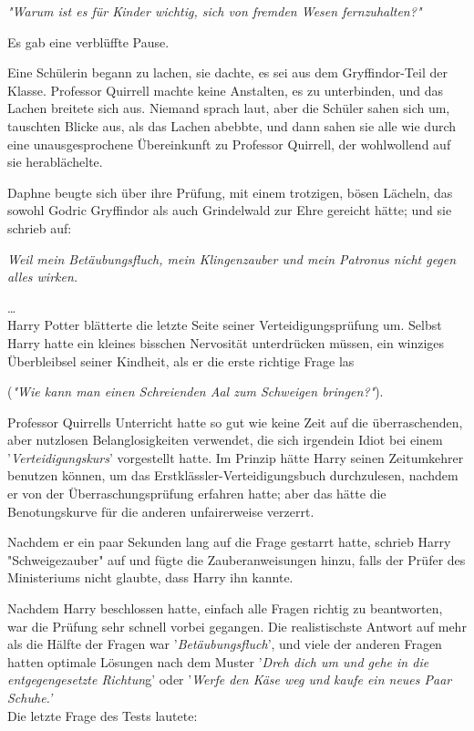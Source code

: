 {\emph{"Warum ist es für Kinder wichtig, sich von fremden Wesen fernzuhalten?"}

Es gab eine verblüffte Pause.

Eine Schülerin begann zu lachen, sie dachte, es sei aus dem Gryffindor-Teil der Klasse. Professor Quirrell machte keine Anstalten, es zu unterbinden, und das Lachen breitete sich aus. Niemand sprach laut, aber die Schüler sahen sich um, tauschten Blicke aus, als das Lachen abebbte, und dann sahen sie alle wie durch eine unausgesprochene Übereinkunft zu Professor Quirrell, der wohlwollend auf sie herablächelte.

Daphne beugte sich über ihre Prüfung, mit einem trotzigen, bösen Lächeln, das sowohl Godric Gryffindor als auch Grindelwald zur Ehre gereicht hätte; und sie schrieb auf:

\emph{Weil mein Betäubungsfluch, mein Klingenzauber und mein Patronus nicht gegen alles wirken.}

…\\ Harry Potter blätterte die letzte Seite seiner Verteidigungsprüfung um. Selbst Harry hatte ein kleines bisschen Nervosität unterdrücken müssen, ein winziges Überbleibsel seiner Kindheit, als er die erste richtige Frage las

(\emph{"Wie kann man einen Schreienden Aal zum Schweigen bringen?"}).

Professor Quirrells Unterricht hatte so gut wie keine Zeit auf die überraschenden, aber nutzlosen Belanglosigkeiten verwendet, die sich irgendein Idiot bei einem '\emph{Verteidigungskurs}' vorgestellt hatte. Im Prinzip hätte Harry seinen Zeitumkehrer benutzen können, um das Erstklässler-Verteidigungsbuch durchzulesen, nachdem er von der Überraschungsprüfung erfahren hatte; aber das hätte die Benotungskurve für die anderen unfairerweise verzerrt.

Nachdem er ein paar Sekunden lang auf die Frage gestarrt hatte, schrieb Harry "Schweigezauber" auf und fügte die Zauberanweisungen hinzu, falls der Prüfer des Ministeriums nicht glaubte, dass Harry ihn kannte.

Nachdem Harry beschlossen hatte, einfach alle Fragen richtig zu beantworten, war die Prüfung sehr schnell vorbei gegangen. Die realistischste Antwort auf mehr als die Hälfte der Fragen war '\emph{Betäubungsfluch}', und viele der anderen Fragen hatten optimale Lösungen nach dem Muster '\emph{Dreh dich um und gehe in die entgegengesetzte Richtun}g' oder '\emph{Werfe den Käse weg und kaufe ein neues Paar Schuhe.'}\\ Die letzte Frage des Tests lautete:

}
